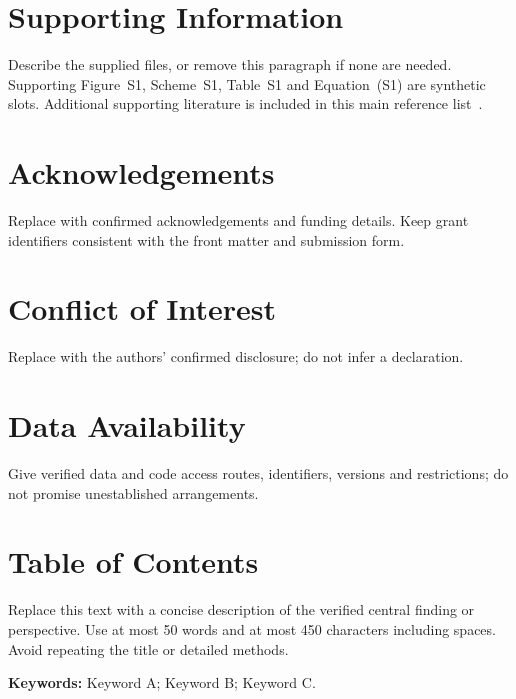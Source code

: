 \documentclass[serif,twocolumn]{prism-wiley-article}
\begin{document}
\section*{Supporting Information}
Describe the supplied files, or remove this paragraph if none are needed.
Supporting Figure~S1, Scheme~S1, Table~S1 and Equation~(S1) are synthetic
slots. Additional supporting literature is included in this main reference
list~\cite{peng2011reproducible}.

\section*{Acknowledgements}
Replace with confirmed acknowledgements and funding details. Keep grant
identifiers consistent with the front matter and submission form.

\section*{Conflict of Interest}
Replace with the authors' confirmed disclosure; do not infer a declaration.

\section*{Data Availability}
Give verified data and code access routes, identifiers, versions and
restrictions; do not promise unestablished arrangements.




\clearpage
\onecolumn
\section*{Table of Contents}
\begin{center}
\begingroup
\setlength{\fboxsep}{0pt}
\endgroup
\end{center}
Replace this text with a concise description of the verified central
finding or perspective. Use at most 50 words and at most 450 characters
including spaces. Avoid repeating the title or detailed methods.

\medskip
\noindent\textbf{Keywords:} Keyword A; Keyword B; Keyword C.
\end{document}
